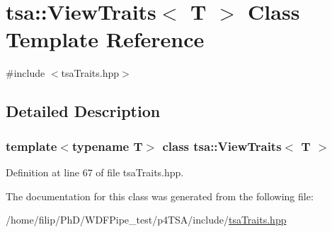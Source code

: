 \hypertarget{classtsa_1_1_view_traits}{}\section{tsa\+:\+:View\+Traits$<$ T $>$ Class Template Reference}
\label{classtsa_1_1_view_traits}


{\ttfamily \#include $<$tsa\+Traits.\+hpp$>$}



\subsection{Detailed Description}
\subsubsection*{template$<$typename T$>$\newline
class tsa\+::\+View\+Traits$<$ T $>$}



Definition at line 67 of file tsa\+Traits.\+hpp.



The documentation for this class was generated from the following file\+:\begin{DoxyCompactItemize}
\item 
/home/filip/\+Ph\+D/\+W\+D\+F\+Pipe\+\_\+test/p4\+T\+S\+A/include/\hyperlink{tsa_traits_8hpp}{tsa\+Traits.\+hpp}\end{DoxyCompactItemize}
